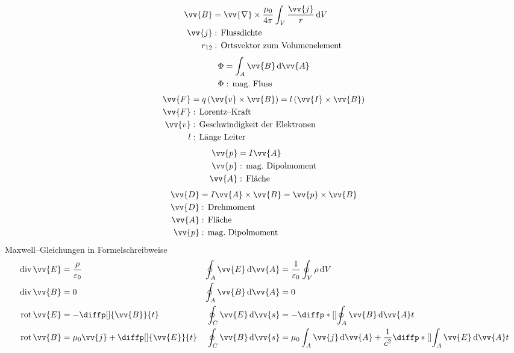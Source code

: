 \documentclass[a4paper,12pt]{article}
\newcommand{\td}{\,\text{d}}
\numberwithin{equation}{section}
\begin{document}
\begin{align} 
        \vv{B}&=\vv{\nabla }\times \dfrac{\mu _0}{4\pi }\int_{V}^{}\dfrac{\vv{j}}{r}\td V\\
        \vv{j}&:\,\text{Flussdichte}\,\nonumber \\
        r_{12}&:\,\text{Ortsvektor zum Volumenelement}\,\nonumber 
\end{align} 
\begin{align} 
        \Phi &=\int_{A}^{}\vv{B}\td \vv{A}\\
        \Phi &:\,\text{mag.\ Fluss}\,\nonumber 
\end{align} 
\begin{align} 
        \vv{F}&=q\left(\vv{v}\times \vv{B}\right)=l\left(\vv{I}\times \vv{B}\right)\\
        \vv{F}&:\,\text{Lorentz--Kraft}\,\nonumber \\
        \vv{v}&:\,\text{Geschwindigkeit der Elektronen}\,\nonumber \\
        l&:\,\text{Länge Leiter}\,\nonumber 
\end{align} 
\begin{align} 
        \vv{p}&=I\vv{A}\\
        \vv{p}&:\,\text{mag.\ Dipolmoment}\,\nonumber \\
        \vv{A}&:\,\text{Fläche}\,\nonumber 
\end{align} 
\begin{align} 
        \vv{D}&=I\vv{A}\times \vv{B}=\vv{p}\times \vv{B}\\
        \vv{D}&:\,\text{Drehmoment}\,\nonumber \\
        \vv{A}&:\,\text{Fläche}\,\nonumber \\
        \vv{p}&:\,\text{mag.\ Dipolmoment}\,\nonumber 
\end{align} 
Maxwell--Gleichungen in Formelschreibweise
\begin{align} 
        \,\text{div}\,\vv{E}&=\dfrac{\rho }{\varepsilon _0}&\oint_{A}^{}\vv{E}\td \vv{A}&=\dfrac{1}{\varepsilon _0}\oint_{V}^{}\rho \td V\\
        \,\text{div}\,\vv{B}&=0&\oint_{A}^{}\vv{B}\td \vv{A}&=0\\
        \,\text{rot}\,\vv{E}&=-\diffp[]{\vv{B}}{t}&\oint_{C}^{}\vv{E}\td \vv{s}&=-\diffp*[]{\oint_{A}^{}\vv{B}\td \vv{A}}{t}\\
        \,\text{rot}\,\vv{B}&=\mu _0\vv{j}+\diffp[]{\vv{E}}{t}&\oint_{C}^{}\vv{B}\td \vv{s}&=\mu _0\int_{A}^{}\vv{j}\td \vv{A}+\dfrac{1}{c^2}\diffp*[]{\int_{A}^{}\vv{E}\td \vv{A}}{t}
\end{align} 
\end{document}

